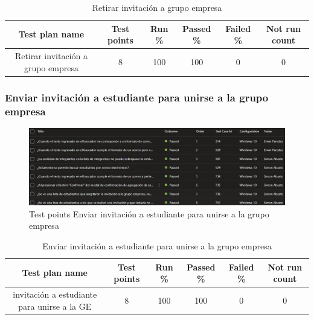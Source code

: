 \documentclass[12pt,letterpaper]{article}
\begin{document}
 \begin{table}[h] %
    \centering %
    \caption{Retirar invitación a grupo empresa} %
    \begin{tabular}{|c|c|c|c|c|c|}
        \rowcolor{green} %
        \hline
        Test plan name & Test points & Run \% & Passed \% & Failed \% & Not run count \\
        \hline
        Retirar invitación a grupo empresa& 8 & 100 & 100 & 0 & 0 \\
        \hline
    \end{tabular}
\end{table}



\subsubsection{Enviar invitación a estudiante para unirse a la grupo empresa}
\begin{figure}[H]
        \centering
        \includegraphics[width=1\linewidth]{cases enviar invi.png}
        \caption{Test points Enviar invitación a estudiante para unirse a la grupo empresa}
    \end{figure}

 \begin{table}[h] %
    \centering %
    \caption{Enviar invitación a estudiante para unirse a la grupo empresa} %
    \begin{tabular}{|c|c|c|c|c|c|}
        \rowcolor{green} %
        \hline
        Test plan name & Test points & Run \% & Passed \% & Failed \% & Not run count \\
        \hline
    invitación a estudiante para unirse a la GE& 8& 100 & 100 & 0 & 0 \\
        \hline
    \end{tabular}
\end{table}
\end{document}
